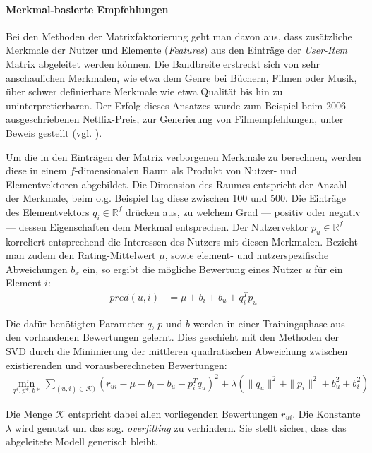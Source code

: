 \paragraph{Merkmal-basierte Empfehlungen} Bei den Methoden der Matrixfaktorierung geht man davon aus, dass zusätzliche Merkmale der Nutzer und Elemente (\textit{Features}) aus den Einträge der \textit{User-Item} Matrix abgeleitet werden können. Die Bandbreite erstreckt sich von sehr anschaulichen Merkmalen, wie etwa dem Genre bei Büchern, Filmen oder Musik, über schwer definierbare Merkmale wie etwa Qualität bis hin zu uninterpretierbaren. Der Erfolg dieses Ansatzes wurde zum Beispiel beim 2006 ausgeschriebenen Netflix-Preis, zur Generierung von Filmempfehlungen, unter Beweis gestellt (vgl. \citep{Koren:2009:MFT:1608565.1608614}).

Um die in den Einträgen der Matrix verborgenen Merkmale zu berechnen, werden diese in einem $f$-dimensionalen Raum als Produkt von Nutzer- und Elementvektoren abgebildet. Die Dimension des Raumes entspricht der Anzahl der Merkmale, beim o.g. Beispiel lag diese zwischen 100 und 500. Die Einträge des Elementvektors $q_i \in \mathbb{R}^f$ drücken aus, zu welchem Grad --- positiv oder negativ --- dessen Eigenschaften dem Merkmal entsprechen. Der Nutzervektor $p_u \in \mathbb{R}^f$ korreliert entsprechend die Interessen des Nutzers mit diesen Merkmalen. Bezieht man zudem den Rating-Mittelwert $\mu$, sowie element- und nutzerspezifische Abweichungen $b_x$ ein, so ergibt die mögliche Bewertung eines Nutzer $u$ für ein Element $i$:
\begin{align}
pred(u,i) & = \mu + b_i + b_u + q_i^T p_u \label{form:calcpredsvd}
\end{align}

Die dafür benötigten Parameter $q$, $p$ und $b$ werden in einer Trainingsphase aus den vorhandenen Bewertungen gelernt. Dies geschieht mit den Methoden der \acf{SVD}  \citep{golub65} durch die Minimierung der mittleren quadratischen Abweichung zwischen existierenden und vorausberechneten Bewertungen:
\begin{align}
\min_{q*,p*,b*}{ \sum_{(u,i) \in \mathcal{K})} (r_{ui} -\mu-b_i - b_u - p_i^T q_u)^2  + \lambda ( \|q_u\|^2 + \|p_i\|^2 + b_u^2 + b_i^2) \label{form:trainsvd}   }
\end{align}

Die Menge $\mathcal{K}$ entspricht dabei allen vorliegenden Bewertungen $r_{ui}$. Die Konstante $\lambda$ wird genutzt um das sog. \textit{overfitting} zu verhindern. Sie stellt sicher, dass das abgeleitete Modell generisch bleibt.  \citep{Koren:2009:MFT:1608565.1608614, hb_05}

